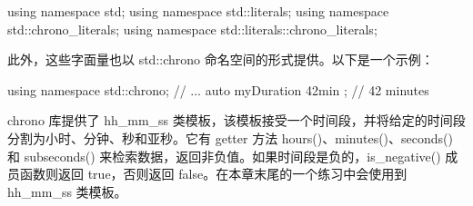 \begin{cpp}
using namespace std;
using namespace std::literals;
using namespace std::chrono_literals;
using namespace std::literals::chrono_literals;
\end{cpp}

此外，这些字面量也以 std::chrono 命名空间的形式提供。以下是一个示例：

\begin{cpp}
using namespace std::chrono;
// ...
auto myDuration { 42min }; // 42 minutes
\end{cpp}


chrono 库提供了 hh\_mm\_ss 类模板，该模板接受一个时间段，并将给定的时间段分割为小时、分钟、秒和亚秒。它有 getter 方法 hours()、minutes()、seconds() 和 subseconds() 来检索数据，返回非负值。如果时间段是负的，is\_negative() 成员函数则返回 true，否则返回 false。在本章末尾的一个练习中会使用到 hh\_mm\_ss 类模板。

